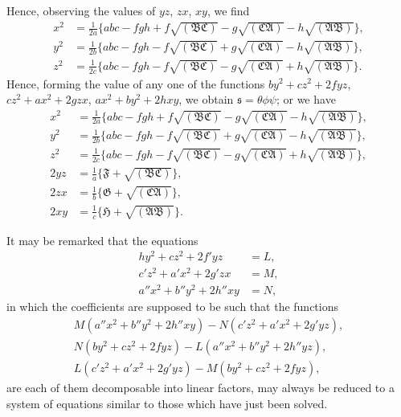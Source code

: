 \documentclass[11pt,a4paper]{article}
\theoremstyle{definition}
\begin{document}
Hence, observing the values of $yz$, $zx$, $xy$, we find
\begin{align*}
x^{2} &= \tfrac{1}{2a}\{abc - fgh + f\sqrt{(\mathfrak{B}\mathfrak{C})} - g\sqrt{(\mathfrak{C}\mathfrak{A})} - h\sqrt{(\mathfrak{A}\mathfrak{B})}\}, \\
y^{2} &= \tfrac{1}{2b}\{abc - fgh - f\sqrt{(\mathfrak{B}\mathfrak{C})} + g\sqrt{(\mathfrak{C}\mathfrak{A})} - h\sqrt{(\mathfrak{A}\mathfrak{B})}\}, \\
z^{2} &= \tfrac{1}{2c}\{abc - fgh - f\sqrt{(\mathfrak{B}\mathfrak{C})} - g\sqrt{(\mathfrak{C}\mathfrak{A})} + h\sqrt{(\mathfrak{A}\mathfrak{B})}\}.
\end{align*}
Hence, forming the value of any one of the functions $by^{2} + cz^{2} + 2fyz$, $cz^{2} + ax^{2} + 2gzx$, $ax^{2} + by^{2} + 2hxy$, we obtain $\mathfrak{s} = \theta\phi\psi$; or we have
\begin{align*}
x^{2} &= \tfrac{1}{2a}\{abc - fgh + f\sqrt{(\mathfrak{B}\mathfrak{C})} - g\sqrt{(\mathfrak{C}\mathfrak{A})} - h\sqrt{(\mathfrak{A}\mathfrak{B})}\}, \\
y^{2} &= \tfrac{1}{2b}\{abc - fgh - f\sqrt{(\mathfrak{B}\mathfrak{C})} + g\sqrt{(\mathfrak{C}\mathfrak{A})} - h\sqrt{(\mathfrak{A}\mathfrak{B})}\}, \\
z^{2} &= \tfrac{1}{2c}\{abc - fgh - f\sqrt{(\mathfrak{B}\mathfrak{C})} - g\sqrt{(\mathfrak{C}\mathfrak{A})} + h\sqrt{(\mathfrak{A}\mathfrak{B})}\}, \\
2yz &= \tfrac{1}{a}\{\mathfrak{F} + \sqrt{(\mathfrak{B}\mathfrak{C})}\}, \\
2zx &= \tfrac{1}{b}\{\mathfrak{G} + \sqrt{(\mathfrak{C}\mathfrak{A})}\}, \\
2xy &= \tfrac{1}{c}\{\mathfrak{H} + \sqrt{(\mathfrak{A}\mathfrak{B})}\}.
\end{align*}

It may be remarked that the equations
\begin{align*}
hy^{2} + cz^{2} + 2f'yz &= L, \\
c'z^{2} + a'x^{2} + 2g'zx &= M, \\
a''x^{2} + b''y^{2} + 2h''xy &= N,
\end{align*}
in which the coefficients are supposed to be such that the functions
\begin{align*}
M(a''x^{2} + b''y^{2} + 2h''xy) - N(c'z^{2} + a'x^{2} + 2g'yz), \\
N(by^{2} + cz^{2} + 2fyz) - L(a''x^{2} + b''y^{2} + 2h''yz), \\
L(c'z^{2} + a'x^{2} + 2g'yz) - M(by^{2} + cz^{2} + 2fyz),
\end{align*}
are each of them decomposable into linear factors, may always be reduced to a system of equations similar to those which have just been solved.
\end{document}
